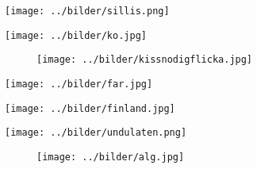 \begin{intersong}
\sffamily\bfseries\LARGE{}
\begin{center}
\texttt{[image: ../bilder/sillis.png]} 
\end{center}
\end{intersong}
\sclearpage

\begin{intersong}
\begin{center}
\texttt{[image: ../bilder/ko.jpg]} 
\end{center}
\end{intersong}
\sclearpage


\sclearpage

%
\clearpage

\begin{figure}
\begin{center}
\texttt{[image: ../bilder/kissnodigflicka.jpg]} 
\end{center}
\end{figure}
\clearpage

\begin{intersong}
\begin{center}
\texttt{[image: ../bilder/far.jpg]} 
\end{center}
\end{intersong}
\sclearpage


\clearpage

\sclearpage

\begin{intersong}
\begin{center}
\texttt{[image: ../bilder/finland.jpg]} 
\end{center}
\end{intersong}
\sclearpage

\sclearpage

\sclearpage

\begin{intersong}
\begin{center}
\texttt{[image: ../bilder/undulaten.png]} 
\end{center}
\end{intersong}
\sclearpage

\sclearpage

\sclearpage



\begin{figure}
\begin{center}
\texttt{[image: ../bilder/alg.jpg]} 
\end{center}
\end{figure}
\clearpage

\clearpage

\clearpage

\clearpage

\clearpage

\clearpage


%
\clearpage

